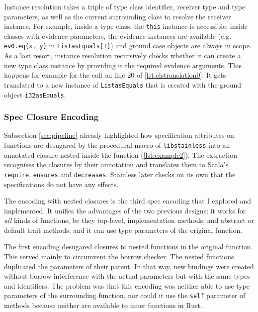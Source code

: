 Instance resolution takes a triple of type class identifier, receiver type and
type parameters, as well as the current surrounding class to resolve the
receiver instance. For example, inside a type class, the \lstinline!this!
instance is accessible, inside classes with evidence parameters, the evidence
instances are available (e.g. \lstinline!ev0.eq(x, y)! in
\lstinline!ListasEquals[T]!) and ground case objects are always in scope. As a
last resort, instance resolution recursively checks whether it can create a new
type class instance by providing it the required evidence arguments. This
happens for example for the call on line 20 of \autoref{lst:clstranslation0}. It
gets translated to a new instance of \lstinline!ListasEquals! that is created
with the ground object \lstinline!i32asEquals!.



\subsubsection{Spec Closure Encoding}

Subsection \ref{sec:pipeline} already highlighted how specification attributes
on functions are desugared by the procedural macro of \lstinline!libstainless!
into an annotated closure nested inside the function (\autoref{lst:example2}).
The extraction recognises the closures by their annotation and translates them
to Scala's \lstinline!require!, \passthrough{\lstinline!ensures!} and
\passthrough{\lstinline!decreases!}. Stainless later checks on its own that the
specifications do not have any effects.

The encoding with nested closures is the third spec encoding that I explored and
implemented. It unifies the advantages of the two previous designs: it works for
\emph{all} kinds of functions, be they top-level, implementation methods, and
abstract or default trait methods; and it can use type parameters of the
original function.

The first encoding desugared closures to nested functions in the original
function. This served mainly to circumvent the borrow checker. The nested
functions duplicated the parameters of their parent. In that way, new bindings
were created without borrow interference with the actual parameters but with the
same types and identifiers. The problem was that this encoding was neither able
to use type parameters of the surrounding function, nor could it use the
\passthrough{\lstinline!self!} parameter of methods because neither are
available to inner functions in Rust.

